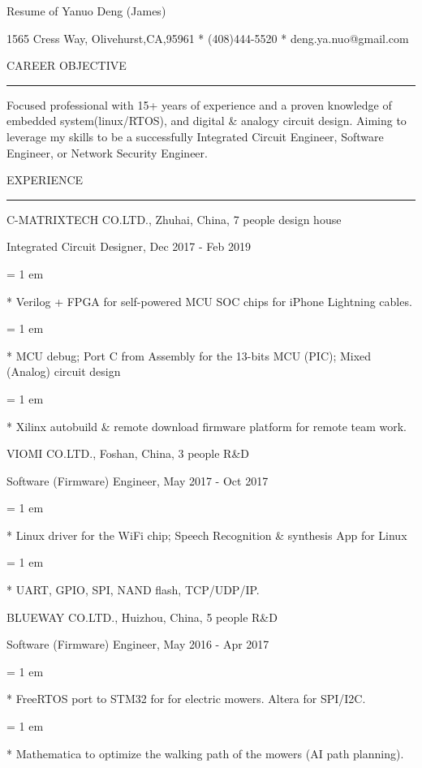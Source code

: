 

\centerline{ \FFbg
Resume of Yanuo Deng (James)
}

\centerline{ %
1565 Cress Way, Olivehurst,CA,95961
*
(408)444-5520
*
deng.ya.nuo@gmail.com
}

{ \medbreak } { \FFbg
CAREER OBJECTIVE
}

{ \smallbreak } {\par\noindent\hrule} { \smallbreak }

    Focused professional with 15+ years of experience
and a proven knowledge of embedded system(linux/RTOS),
and digital \& analogy circuit design.
    Aiming to leverage my skills to be a successfully
Integrated Circuit Engineer,
Software Engineer,
or Network Security Engineer.

{ \medbreak } { \FFbg
EXPERIENCE
}
{ \smallbreak } {\par\noindent\hrule} { \smallbreak }

{ \medbreak } { \FFbg
C-MATRIXTECH CO.LTD., Zhuhai, China, 7 people design house
}

{ \FFte
Integrated Circuit Designer, Dec 2017 - Feb 2019
}

{ \parindent = 1 em \item{*}
 Verilog + FPGA for self-powered MCU SOC chips for iPhone Lightning cables.
}

{ \parindent = 1 em \item{*}
 MCU debug; Port C from Assembly for the 13-bits MCU (PIC); Mixed (Analog) circuit design
}
{ \parindent = 1 em \item{*}
 Xilinx autobuild \& remote download firmware platform for remote team work.
}

{ \medbreak } { \FFbg
VIOMI CO.LTD., Foshan, China, 3 people R\&D
}

{ \FFte
Software (Firmware) Engineer, May 2017 - Oct 2017
}

{ \parindent = 1 em \item{*}
 Linux driver for the WiFi chip; Speech Recognition \& synthesis App for Linux
 }
{ \parindent = 1 em \item{*}
 UART, GPIO, SPI, NAND flash, TCP/UDP/IP.
 }

{ \medbreak } { \FFbg
BLUEWAY CO.LTD., Huizhou, China, 5 people R\&D
}

{ \FFte
Software (Firmware) Engineer, May 2016 - Apr 2017
}
{ \parindent = 1 em \item{*}
 FreeRTOS port to STM32 for for electric mowers. Altera for SPI/I2C.
}
{ \parindent = 1 em \item{*}
Mathematica to optimize the walking path of the mowers (AI path planning).
}

